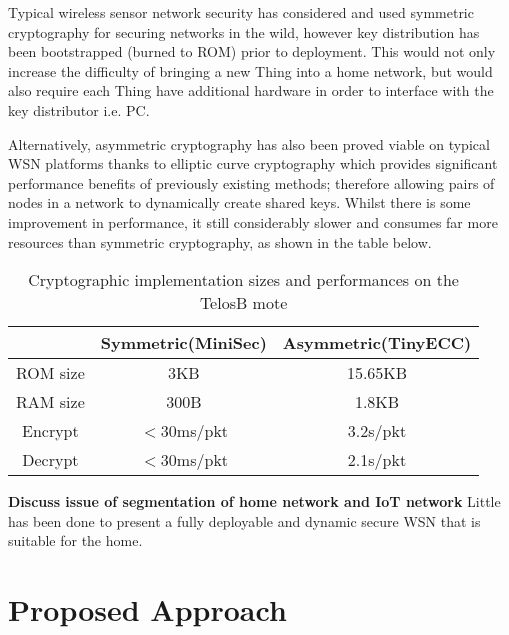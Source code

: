 \documentclass{mprop}
\begin{document}
Typical wireless sensor network security has considered and used symmetric cryptography\cite{TinySec,luk2007minisec, ContikiSec} for securing networks in the wild, however key distribution has been bootstrapped (burned to ROM) prior to deployment. This would not only increase the difficulty of bringing a new Thing into a home network, but would also require each Thing have additional hardware in order to interface with the key distributor i.e. PC. 

Alternatively, asymmetric cryptography has also been proved viable on typical WSN platforms thanks to elliptic curve cryptography which provides significant performance benefits of previously existing methods\cite{TinyECC}; therefore allowing pairs of nodes in a network to dynamically create shared keys. Whilst there is some improvement in performance, it still considerably slower and consumes far more resources than symmetric cryptography, as shown in the table below.

\begin{table}[h] %
  \begin{center} 
  \label{tab:crypto_compare}
  \begin{tabular}{|c|c|c|} 
  \hline
           & Symmetric(MiniSec) & Asymmetric(TinyECC) \\ \hline
  ROM size & 3KB                & 15.65KB \\ \hline
  RAM size & 300B               & 1.8KB \\ \hline
  Encrypt  & $<$30ms/pkt        & 3.2s/pkt \\ \hline 
  Decrypt  & $<$30ms/pkt        & 2.1s/pkt \\ \hline
  \end{tabular}
  \caption{Cryptographic implementation sizes and performances on the TelosB mote}
  \end{center}
\end{table}

\textbf{Discuss issue of segmentation of home network and IoT network}
Little has been done to present a fully deployable and dynamic secure WSN that is suitable for the home. 



\section{Proposed Approach}
\end{document}
